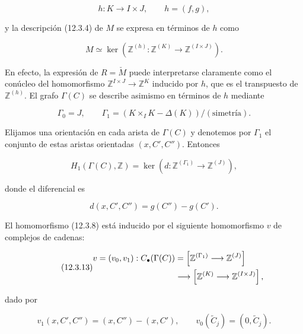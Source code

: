 \begin{equation}\tag{12.3.9}
 h:K\longrightarrow I\times J,
 \qquad h=(f,g),
\end{equation}

\noindent
y la descripción (12.3.4) de $M$ se expresa en términos de $h$ como

\begin{equation}\tag{12.3.10}
 M\simeq\ker\left(
  \mathbb Z^{(h)}:\mathbb Z^{(K)}\longrightarrow
  \mathbb Z^{(I\times J)}\right).
\end{equation}

En efecto, la expresión  de $R=\check M$ puede interpretarse
claramente como el conúcleo del homomorfismo
$\mathbb Z^{I\times J}\to\mathbb Z^K$ inducido por $h$, que es el
transpuesto de $\mathbb Z^{(h)}$. El grafo $\Gamma(C)$ se describe
asimismo en términos de $h$ mediante

\begin{equation*}
 \Gamma_0=J,
 \qquad
 \Gamma_1=(K\times_I K-\Delta(K))/(\text{simetría}).
\end{equation*}

Elijamos una orientación en cada arista de $\Gamma(C)$ y denotemos por
$\Gamma_1$ el conjunto de estas aristas orientadas $(x,C',C'')$. Entonces

\begin{equation}\tag{12.3.11}
 H_1(\Gamma(C),\mathbb Z)=
 \ker\left(d:\mathbb Z^{(\Gamma_1)}\longrightarrow\mathbb Z^{(J)}\right),
\end{equation}

\noindent
donde el diferencial es

\begin{equation}\tag{12.3.12}
 d(x,C',C'')=g(C'')-g(C').
\end{equation}

El homomorfismo (12.3.8) está inducido por el siguiente homomorfismo $v$
de complejos de cadenas:

\begin{equation}\tag{12.3.13}
 \begin{split}
 v=(v_0,v_1):C_\bullet(\Gamma(C))
   &=\left[\mathbb Z^{(\Gamma_1)}
      \longrightarrow\mathbb Z^{(J)}\right]\\
   &\longrightarrow
     \left[\mathbb Z^{(K)}\longrightarrow\mathbb Z^{(I\times J)}\right],
 \end{split}
\end{equation}

\noindent
dado por

\begin{equation}\tag{12.3.14}
 v_1(x,C',C'')=(x,C'')-(x,C'),
 \qquad
 v_0(\widetilde C_j)=(0,\widetilde C_j).
\end{equation}
